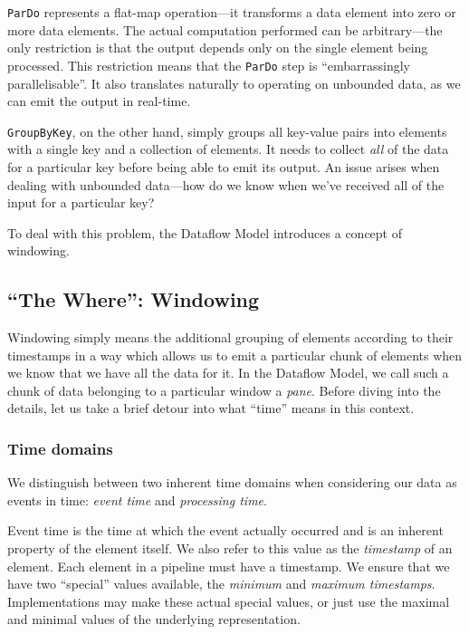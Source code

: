 
\verb|ParDo| represents a flat-map operation---it transforms a data element into zero or more data elements.
The actual computation performed can be arbitrary---the only restriction is that the output depends only on the single element being processed.
This restriction means that the \verb|ParDo| step is ``embarrassingly parallelisable''.
It also translates naturally to operating on unbounded data, as we can emit the output in real-time.

\verb|GroupByKey|, on the other hand, simply groups all key-value pairs into elements with a single key and a collection of elements.
It needs to collect \emph{all} of the data for a particular key before being able to emit its output.
An issue arises when dealing with unbounded data---how do we know when we've received all of the input for a particular key?

To deal with this problem, the Dataflow Model introduces a concept of windowing.


\subsection{``The Where'': Windowing}

Windowing simply means the additional grouping of elements according to their timestamps in a way which allows us to emit a particular chunk of elements when we know that we have all the data for it.
In the Dataflow Model, we call such a chunk of data belonging to a particular window a \emph{pane}.
Before diving into the details, let us take a brief detour into what ``time'' means in this context.

\subsubsection{Time domains}
We distinguish between two inherent time domains when considering our data as events in time: \emph{event time} and \emph{processing time}.

Event time is the time at which the event actually occurred and is an inherent property of the element itself.
We also refer to this value as the \emph{timestamp} of an element.
Each element in a pipeline must have a timestamp.
We ensure that we have two ``special'' values available, the \emph{minimum} and \emph{maximum timestamps}.
Implementations may make these actual special values, or just use the maximal and minimal values of the underlying representation.

